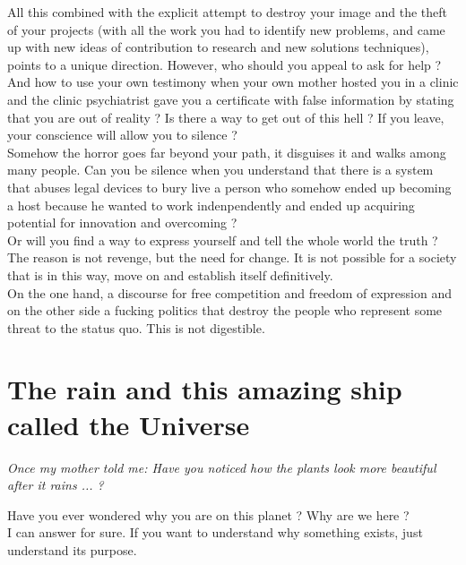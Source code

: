 \documentclass[11pt]{book}
\begin{document}
\noindent All this combined with the explicit attempt to destroy your image and the theft of your projects (with all the work you had to identify new problems, and came up with new ideas of contribution to research and new solutions techniques), points to a unique direction. However, who should you appeal to ask for help ? And how to use your own testimony when your own mother hosted you in a clinic and the clinic psychiatrist gave you a certificate with false information by stating that you are out of reality ? Is there a way to get out of this hell ? If you leave, your conscience will allow you to silence ? \\

\noindent Somehow the horror goes far beyond your path, it disguises it and walks among many people. Can you be silence when you understand that there is a system that abuses legal devices to bury live a person who somehow ended up becoming a host because he wanted to work indenpendently and ended up acquiring potential for innovation and overcoming ? \\

\noindent Or will you find a way to express yourself and tell the whole world the truth ? \\

\noindent The reason is not revenge, but the need for change. It is not possible for a society that is in this way, move on and establish itself definitively. \\

\noindent On the one hand, a discourse for free competition and freedom of expression and on the other side a fucking politics that destroy the people who represent some threat to the status quo. This is not digestible.

\chapter{The rain and this amazing ship called the Universe}

\noindent \begin{center} \emph{Once my mother told me: Have you noticed how the plants look more beautiful after it rains ... ?} \end{center}

\noindent Have you ever wondered why you are on this planet ? Why are we here ? \\

\noindent I can answer for sure. If you want to understand why something exists, just understand its purpose. \\
\end{document}
